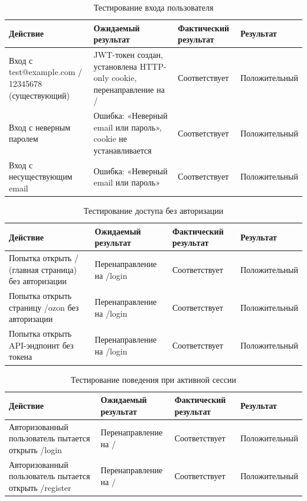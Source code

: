 \begin{table}[H]
\caption{\label{tab:testEnter}Тестирование входа пользователя}
\small
\begin{tabular}{|p{4cm}|p{4cm}|p{3cm}|p{4cm}|}
\hline
Действие & Ожидаемый результат & Фактический результат & Результат \\ \hline
Вход с test@example.com / 12345678 (существующий) & JWT-токен создан, установлена HTTP-only cookie, перенаправление на / & Соответствует & Положительный \\ \hline
Вход с неверным паролем & Ошибка: «Неверный email или пароль», cookie не устанавливается & Соответствует & Положительный \\ \hline
Вход с несуществующим email & Ошибка: «Неверный email или пароль» & Соответствует & Положительный \\ \hline
\end{tabular}
\end{table}

\begin{table}[H]
\caption{\label{tab:testAuth}Тестирование доступа без авторизации}
\small
\begin{tabular}{|p{4cm}|p{4cm}|p{3cm}|p{4cm}|}
\hline
Действие & Ожидаемый результат & Фактический результат & Результат \\ \hline
Попытка открыть / (главная страница) без авторизации & Перенаправление на /login & Соответствует & Положительный \\ \hline
Попытка открыть страницу /ozon без авторизации & Перенаправление на /login & Соответствует & Положительный \\ \hline
Попытка открыть API-эндпоинт без токена & Перенаправление на /login & Соответствует & Положительный \\ \hline
\end{tabular}
\end{table}

\begin{table}[H]
\caption{\label{tab:testSession}Тестирование поведения при активной сессии}
\small
\begin{tabular}{|p{4cm}|p{4cm}|p{3cm}|p{4cm}|}
\hline
Действие & Ожидаемый результат & Фактический результат & Результат \\ \hline
Авторизованный пользователь пытается открыть /login & Перенаправление на / & Соответствует & Положительный \\ \hline
Авторизованный пользователь пытается открыть /register & Перенаправление на / & Соответствует & Положительный \\ \hline
\end{tabular}
\end{table}

